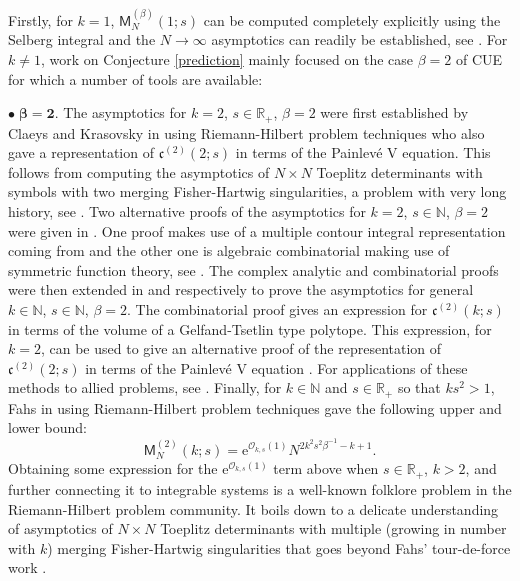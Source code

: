 \documentclass[]{article}
\begin{document}
Firstly, for $k=1$, $\mathsf{M}^{(\beta)}_N(1;s)$ can be computed completely explicitly using the Selberg integral and the $N \to \infty$ asymptotics can readily be established, see \cite{KeatingSnaith,RandomDets}. For $k\neq 1$, work on Conjecture \ref{prediction} mainly focused on the case $\beta=2$ of CUE for which a number of tools are available:

$\bullet  \boldsymbol{\; \beta=2}$. The asymptotics for $k=2$, $s \in \mathbb{R}_+$, $\beta=2$ were first established by Claeys and Krasovsky in \cite{ClaeysKrasovsky} using Riemann-Hilbert problem techniques who also gave a representation of $\mathfrak{c}^{(2)}(2;s)$ in terms of the Painlev\'{e} V equation. This follows from computing the asymptotics of $N\times N$ Toeplitz determinants with symbols with two merging Fisher-Hartwig singularities, a problem with very long history, see \cite{Widom,ClaeysKrasovsky,ClaeysFahs,Fahs,BourgadeFalconet}. Two alternative proofs of the asymptotics for $k=2$, $s \in \mathbb{N}$, $\beta=2$ were given in \cite{KRRR}. One proof makes use of a multiple contour integral representation coming from \cite{CFKRS} and the other one is algebraic combinatorial making use of symmetric function theory, see \cite{BympGamburd}. The complex analytic and combinatorial proofs were then extended in \cite{BaileyKeatingMoM} and \cite{AssiotisKeatingMoM} respectively to prove the asymptotics for general $k\in \mathbb{N}$, $s \in \mathbb{N}$, $\beta=2$. The combinatorial proof gives an expression for $\mathfrak{c}^{(2)}(k;s)$ in terms of the volume of a Gelfand-Tsetlin type polytope. This expression, for $k=2$, can be used to give an alternative proof of the representation of $\mathfrak{c}^{(2)}(2;s)$ in terms of the Painlev\'{e} V equation \cite{BasorGeRubinstein,BasorChenEhrhardt}. For applications of these methods to allied problems, see \cite{ABK, MoMEhrhart,BaileyKeatingSurvey}. Finally, for $k\in  \mathbb{N}$ and $s\in \mathbb{R}_+$ so that $ks^2>1$, Fahs in \cite{Fahs} using Riemann-Hilbert problem techniques gave the following upper and lower bound:
\begin{equation*}
\mathsf{M}^{(2)}_N(k;s)=\mathrm{e}^{\mathcal{O}_{k,s}(1)} N^{2k^2s^2\beta^{-1}-k+1}.
\end{equation*}
Obtaining some expression for the $\mathrm{e}^{\mathcal{O}_{k,s}(1)}$ term above when $s \in \mathbb{R}_+$, $k>2$,  and further connecting it to integrable systems is a well-known folklore problem in the Riemann-Hilbert problem community. It boils down to a delicate understanding of asymptotics of $N\times N$ Toeplitz determinants with multiple (growing in number with $k$) merging  Fisher-Hartwig singularities that goes beyond Fahs' tour-de-force work \cite{Fahs}. 
\end{document}
